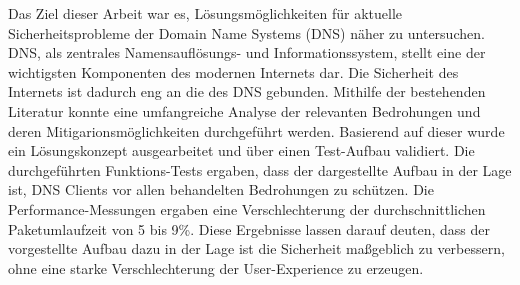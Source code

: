 
Das Ziel dieser Arbeit war es, Lösungsmöglichkeiten für aktuelle Sicherheitsprobleme der Domain Name Systems (DNS) näher zu untersuchen. DNS, als zentrales Namensauflösungs- und Informationssystem, stellt eine der wichtigsten Komponenten des modernen Internets dar. Die Sicherheit des Internets ist dadurch eng an die des DNS gebunden. Mithilfe der bestehenden Literatur konnte eine umfangreiche Analyse der relevanten Bedrohungen und deren Mitigarionsmöglichkeiten durchgeführt werden. Basierend auf dieser wurde ein Lösungskonzept ausgearbeitet und über einen Test-Aufbau validiert. Die durchgeführten Funktions-Tests ergaben, dass der dargestellte Aufbau in der Lage ist, DNS Clients vor allen behandelten Bedrohungen zu schützen. Die Performance-Messungen ergaben eine Verschlechterung der durchschnittlichen Paketumlaufzeit von 5 bis 9\%. Diese Ergebnisse lassen darauf deuten, dass der vorgestellte Aufbau dazu in der Lage ist die Sicherheit maßgeblich zu verbessern, ohne eine starke Verschlechterung der User-Experience zu erzeugen.